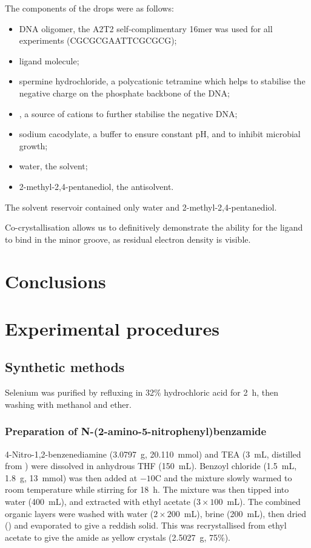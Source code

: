 \begin{refsection}
The components of the drops were as follows:
\begin{itemize}
    \item DNA oligomer, the A2T2 self-complimentary 16mer was used for all experiments (CGCGCGAATTCGCGCG);
    \item ligand molecule;
    \item spermine hydrochloride, a polycationic tetramine which helps to stabilise the negative charge on the phosphate backbone of the DNA;
    \item {}, a source of  cations to further stabilise the negative DNA;
    \item sodium cacodylate, a buffer to ensure constant pH, and to inhibit microbial growth;
    \item water, the solvent;
    \item 2-methyl-2,4-pentanediol, the antisolvent.
\end{itemize}

The solvent reservoir contained only water and 2-methyl-2,4-pentanediol.

Co-crystallisation allows us to definitively demonstrate the ability for the ligand to bind in the minor groove, as residual electron density is visible.


\section{Conclusions}

\section{Experimental procedures}

\subsection{Synthetic methods}

Selenium was purified by refluxing in 32\% hydrochloric acid for 2~h, then washing with methanol and ether.

\subsubsection{Preparation of N-(2-amino-5-nitrophenyl)benzamide }
4-Nitro-1,2-benzenediamine (3.0797~g, 20.110~mmol) and TEA (3~mL, distilled from ) were dissolved in anhydrous THF (150~mL).
Benzoyl chloride (1.5~mL, 1.8~g, 13~mmol) was then added at $-10$\degree C and the mixture slowly warmed to room temperature while stirring for 18~h.
The mixture was then tipped into water (400~mL), and extracted with ethyl acetate ($3\times100$~mL).
The combined organic layers were washed with water ($2\times200$~mL), brine (200~mL), then dried () and evaporated to give a reddish solid.
This was recrystallised from ethyl acetate to give the amide  as yellow crystals (2.5027~g, 75\%).


\end{refsection}
